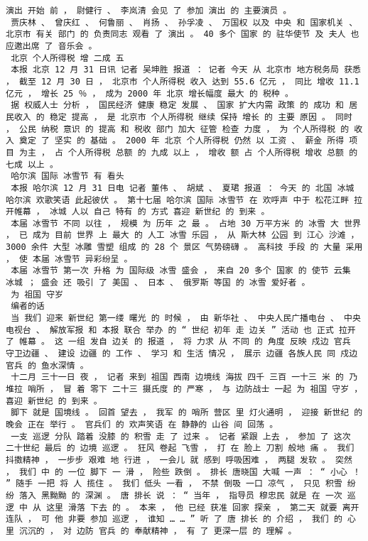 \documentclass{article}
\begin{document}
\begin{Verbatim}[commandchars=\\\{\}]
 演出 开始 前 ， 尉健行 、 李岚清 会见 了 参加 演出 的 主要演员 。 
 贾庆林 、 曾庆红 、 何鲁丽 、 肖扬 、 孙孚凌 、 万国权 以及 中央 和 国家机关 、 北京市 有关 部门 的 负责同志 观看 了 演出 。 40 多个 国家 的 驻华使节 及 夫人 也 应邀出席 了 音乐会 。 
 北京 个人所得税 增 二成 五 
 本报 北京 12 月 31 日讯 记者 吴坤胜 报道 ： 记者 今天 从 北京市 地方税务局 获悉 ， 截至 12 月 30 日 ， 北京市 个人所得税 收入 达到 55.6 亿元 ， 同比 增收 11.1 亿元 ， 增长 25 ％ ， 成为 2000 年 北京 增长幅度 最大 的 税种 。 
 据 权威人士 分析 ， 国民经济 健康 稳定 发展 、 国家 扩大内需 政策 的 成功 和 居民收入 的 稳定 提高 ， 是 北京市 个人所得税 继续 保持 增长 的 主要 原因 。 同时 ， 公民 纳税 意识 的 提高 和 税收 部门 加大 征管 检查 力度 ， 为 个人所得税 的 收入 奠定 了 坚实 的 基础 。 2000 年 北京 个人所得税 仍然 以 工资 、 薪金 所得 项目 为主 ， 占 个人所得税 总额 的 九成 以上 ， 增收 额 占 个人所得税 增收 总额 的 七成 以上 。 
 哈尔滨 国际 冰雪节 有 看头 
 本报 哈尔滨 12 月 31 日电 记者 董伟 、 胡斌 、 夏珺 报道 ： 今天 的 北国 冰城 哈尔滨 欢歌笑语 此起彼伏 。 第十七届 哈尔滨 国际 冰雪节 在 欢呼声 中于 松花江畔 拉开帷幕 ， 冰城 人以 自己 特有 的 方式 喜迎 新世纪 的 到来 。 
 本届 冰雪节 不同 以往 ， 规模 为 历年 之 最 。 占地 30 万平方米 的 冰雪 大 世界 ， 已 成为 目前 世界 上 最大 的 人工 冰雪 乐园 ， 从 斯大林 公园 到 江心 沙滩 ， 3000 余件 大型 冰雕 雪塑 组成 的 28 个 景区 气势磅礴 。 高科技 手段 的 大量 采用 ， 使 本届 冰雪节 异彩纷呈 。 
 本届 冰雪节 第一次 升格 为 国际级 冰雪 盛会 ， 来自 20 多个 国家 的 使节 云集 冰城 ； 盛会 还 吸引 了 美国 、 日本 、 俄罗斯 等国 的 冰雪 爱好者 。 
 为 祖国 守岁 
 编者的话 
 当 我们 迎来 新世纪 第一缕 曙光 的 时候 ， 由 新华社 、 中央人民广播电台 、 中央电视台 、 解放军报 和 本报 联合 举办 的 “ 世纪 初年 走 边关 ” 活动 也 正式 拉开 了 帷幕 。 这 一组 发自 边关 的 报道 ， 将 力求 从 不同 的 角度 反映 戍边 官兵 守卫边疆 、 建设 边疆 的 工作 、 学习 和 生活 情况 ， 展示 边疆 各族人民 同 戍边 官兵 的 鱼水深情 。 
 十二月 三十一日 夜 ， 记者 来到 祖国 西南 边境线 海拔 四千 三百 一十三 米 的 乃堆拉 哨所 ， 冒 着 零下 二十三 摄氏度 的 严寒 ， 与 边防战士 一起 为 祖国 守岁 ， 喜迎 新世纪 的 到来 。 
 脚下 就是 国境线 。 回首 望去 ， 我军 的 哨所 营区 里 灯火通明 ， 迎接 新世纪 的 晚会 正在 举行 。 官兵们 的 欢声笑语 在 静静的 山谷 间 回荡 。 
 一支 巡逻 分队 踏着 没膝 的 积雪 走 了 过来 。 记者 紧跟 上去 ， 参加 了 这次 二十世纪 最后 的 边境 巡逻 。 狂风 卷起 飞雪 ， 打 在 脸上 刀割 般地 痛 。 我们 抖擞精神 ， 一步步 艰难 地 行进 ， 一会儿 就 感到 呼吸困难 ， 两腿 发软 。 突然 ， 我们 中 的 一位 脚下 一 滑 ， 险些 跌倒 。 排长 唐晓国 大喊 一声 ： “ 小心 ！ ” 随手 一把 将 人 揽住 。 我们 低头 一看 ， 不禁 倒吸 一口 凉气 ， 只见 积雪 纷纷 落入 黑黝黝 的 深渊 。 唐 排长 说 ： “ 当年 ， 指导员 穆忠民 就是 在 一次 巡逻 中 从 这里 滑落 下去 的 。 本来 ， 他 已经 获准 回家 探亲 ， 第二天 就要 离开 连队 ， 可 他 非要 参加 巡逻 ， 谁知 … … ” 听 了 唐 排长 的 介绍 ， 我们 的 心里 沉沉的 ， 对 边防 官兵 的 奉献精神 ， 有 了 更深一层 的 理解 。 

\end{Verbatim}
\end{document}
